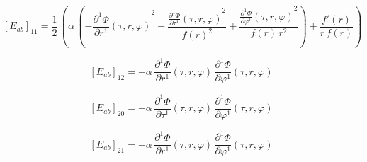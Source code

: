 \documentclass[11pt]{article}
\begin{document}
\begin{dmath*}[breakdepth={5}]
\left[E_{ab}\right]_{11} = \frac{1}{2}\,\left(\alpha\,\left(-{\frac{\partial^{1} \Phi}{\partial r^{1}}\!\left(\tau, r, \varphi\right)}^{2} - \frac{{\frac{\partial^{1} \Phi}{\partial \tau^{1}}\!\left(\tau, r, \varphi\right)}^{2}}{{f\!\left(r\right)}^{2}} + \frac{{\frac{\partial^{1} \Phi}{\partial \varphi^{1}}\!\left(\tau, r, \varphi\right)}^{2}}{f\!\left(r\right)\,{r}^{2}}\right) + \frac{f'\!\left(r\right)}{r\,f\!\left(r\right)}\right)
\end{dmath*}
\par\smallskip
\begin{dmath*}[breakdepth={5}]
\left[E_{ab}\right]_{12} = -\alpha\,\frac{\partial^{1} \Phi}{\partial r^{1}}\!\left(\tau, r, \varphi\right)\,\frac{\partial^{1} \Phi}{\partial \varphi^{1}}\!\left(\tau, r, \varphi\right)
\end{dmath*}
\par\smallskip
\begin{dmath*}[breakdepth={5}]
\left[E_{ab}\right]_{20} = -\alpha\,\frac{\partial^{1} \Phi}{\partial \tau^{1}}\!\left(\tau, r, \varphi\right)\,\frac{\partial^{1} \Phi}{\partial \varphi^{1}}\!\left(\tau, r, \varphi\right)
\end{dmath*}
\par\smallskip
\begin{dmath*}[breakdepth={5}]
\left[E_{ab}\right]_{21} = -\alpha\,\frac{\partial^{1} \Phi}{\partial r^{1}}\!\left(\tau, r, \varphi\right)\,\frac{\partial^{1} \Phi}{\partial \varphi^{1}}\!\left(\tau, r, \varphi\right)
\end{dmath*}
\par\smallskip
\end{document}

